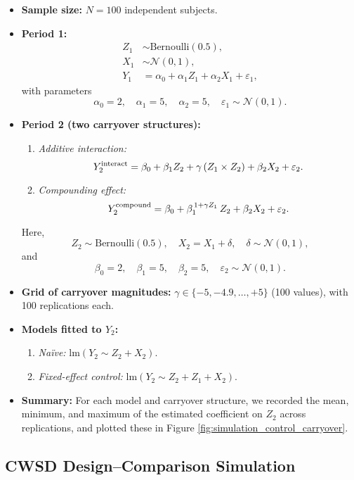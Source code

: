 \begin{itemize}
  \item \textbf{Sample size:} \(N = 100\) independent subjects.
  \item \textbf{Period 1:}
    \begin{align*}
      Z_1 &\sim \mathrm{Bernoulli}(0.5),\\
      X_1 &\sim \mathcal{N}(0,1),\\
      Y_1 &= \alpha_0 + \alpha_1 Z_1 + \alpha_2 X_1 + \varepsilon_1,
    \end{align*}
    with parameters
    \[
      \alpha_0 = 2,\quad \alpha_1 = 5,\quad \alpha_2 = 5,\quad \varepsilon_1 \sim \mathcal{N}(0,1).
    \]
  \item \textbf{Period 2 (two carryover structures):}
    \begin{enumerate}
      \item \emph{Additive interaction:}
        \[
          Y_{2}^{\rm interact} 
          = \beta_0 + \beta_1 Z_2 + \gamma\,(Z_1 \times Z_2) + \beta_2 X_2 + \varepsilon_2.
        \]
      \item \emph{Compounding effect:}
        \[
          Y_{2}^{\rm compound} 
          = \beta_0 + \beta_1^{\,1 + \gamma Z_1}\,Z_2 + \beta_2 X_2 + \varepsilon_2.
        \]
    \end{enumerate}
    Here,
    \[
      Z_2 \sim \mathrm{Bernoulli}(0.5),\quad
      X_2 = X_1 + \delta,\quad \delta\sim \mathcal{N}(0,1),
    \]
    and
    \[
      \beta_0 = 2,\quad \beta_1 = 5,\quad \beta_2 = 5,\quad \varepsilon_2 \sim \mathcal{N}(0,1).
    \]
  \item \textbf{Grid of carryover magnitudes:} \(\gamma\in\{-5, -4.9, \dots, +5\}\) (100 values), with 100 replications each.
  \item \textbf{Models fitted to \(Y_2\):}
    \begin{enumerate}
      \item \emph{Naïve:} \(\mathrm{lm}(Y_2 \sim Z_2 + X_2)\).
      \item \emph{Fixed-effect control:} \(\mathrm{lm}(Y_2 \sim Z_2 + Z_1 + X_2)\).
    \end{enumerate}
  \item \textbf{Summary:} For each model and carryover structure, we recorded the mean, minimum, and maximum of the estimated coefficient on \(Z_2\) across replications, and plotted these in Figure \ref{fig:simulation_control_carryover}.
\end{itemize}

\subsection*{CWSD Design–Comparison Simulation}

